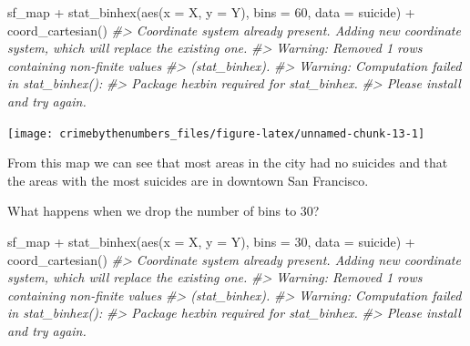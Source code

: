 \documentclass[
  12pt,
  openany]{book}
\newenvironment{Shaded}{\begin{snugshade}}{\end{snugshade}}
\newcommand{\AttributeTok}[1]{\textcolor[rgb]{0.61,0.61,0.61}{#1}}
\newcommand{\CommentTok}[1]{\textcolor[rgb]{0.37,0.37,0.37}{\textit{#1}}}
\newcommand{\DecValTok}[1]{\textcolor[rgb]{0.06,0.06,0.06}{#1}}
\newcommand{\FunctionTok}[1]{\textcolor[rgb]{0,0,0}{#1}}
\newcommand{\NormalTok}[1]{#1}
\newcommand{\SpecialCharTok}[1]{\textcolor[rgb]{0,0,0}{#1}}
\begin{document}
\begin{Shaded}
\begin{Highlighting}[]
\NormalTok{sf\_map }\SpecialCharTok{+}
  \FunctionTok{stat\_binhex}\NormalTok{(}\FunctionTok{aes}\NormalTok{(}\AttributeTok{x =}\NormalTok{ X, }\AttributeTok{y =}\NormalTok{ Y),}
              \AttributeTok{bins =} \DecValTok{60}\NormalTok{,}
              \AttributeTok{data =}\NormalTok{ suicide) }\SpecialCharTok{+}
  \FunctionTok{coord\_cartesian}\NormalTok{() }
\CommentTok{\#\textgreater{} Coordinate system already present. Adding new coordinate system, which will replace the existing one.}
\CommentTok{\#\textgreater{} Warning: Removed 1 rows containing non{-}finite values}
\CommentTok{\#\textgreater{} (stat\_binhex).}
\CommentTok{\#\textgreater{} Warning: Computation failed in \textasciigrave{}stat\_binhex()\textasciigrave{}:}
\CommentTok{\#\textgreater{}   Package \textasciigrave{}hexbin\textasciigrave{} required for \textasciigrave{}stat\_binhex\textasciigrave{}.}
\CommentTok{\#\textgreater{}   Please install and try again.}
\end{Highlighting}
\end{Shaded}

\begin{center}\texttt{[image: crimebythenumbers\_files/figure-latex/unnamed-chunk-13-1]} \end{center}

From this map we can see that most areas in the city had no suicides and that the areas with the most suicides are in downtown San Francisco.

What happens when we drop the number of bins to 30?

\begin{Shaded}
\begin{Highlighting}[]
\NormalTok{sf\_map }\SpecialCharTok{+}
  \FunctionTok{stat\_binhex}\NormalTok{(}\FunctionTok{aes}\NormalTok{(}\AttributeTok{x =}\NormalTok{ X, }\AttributeTok{y =}\NormalTok{ Y),}
              \AttributeTok{bins =} \DecValTok{30}\NormalTok{,}
              \AttributeTok{data =}\NormalTok{ suicide) }\SpecialCharTok{+}
  \FunctionTok{coord\_cartesian}\NormalTok{() }
\CommentTok{\#\textgreater{} Coordinate system already present. Adding new coordinate system, which will replace the existing one.}
\CommentTok{\#\textgreater{} Warning: Removed 1 rows containing non{-}finite values}
\CommentTok{\#\textgreater{} (stat\_binhex).}
\CommentTok{\#\textgreater{} Warning: Computation failed in \textasciigrave{}stat\_binhex()\textasciigrave{}:}
\CommentTok{\#\textgreater{}   Package \textasciigrave{}hexbin\textasciigrave{} required for \textasciigrave{}stat\_binhex\textasciigrave{}.}
\CommentTok{\#\textgreater{}   Please install and try again.}
\end{Highlighting}
\end{Shaded}
\end{document}
